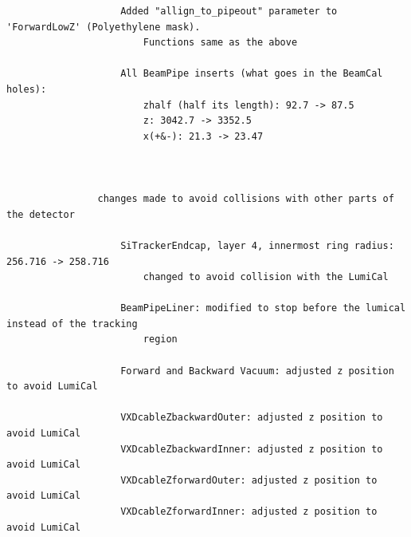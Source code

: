 \documentclass{report}
\begin{document}
\begin{verbatim}
                    Added "allign_to_pipeout" parameter to 'ForwardLowZ' (Polyethylene mask).
                        Functions same as the above 

                    All BeamPipe inserts (what goes in the BeamCal holes):
                        zhalf (half its length): 92.7 -> 87.5
                        z: 3042.7 -> 3352.5
                        x(+&-): 21.3 -> 23.47



                changes made to avoid collisions with other parts of the detector

                    SiTrackerEndcap, layer 4, innermost ring radius: 256.716 -> 258.716
                        changed to avoid collision with the LumiCal

                    BeamPipeLiner: modified to stop before the lumical instead of the tracking
                        region

                    Forward and Backward Vacuum: adjusted z position to avoid LumiCal

                    VXDcableZbackwardOuter: adjusted z position to avoid LumiCal
                    VXDcableZbackwardInner: adjusted z position to avoid LumiCal
                    VXDcableZforwardOuter: adjusted z position to avoid LumiCal
                    VXDcableZforwardInner: adjusted z position to avoid LumiCal
            \end{verbatim}





        
    
\end{document}
